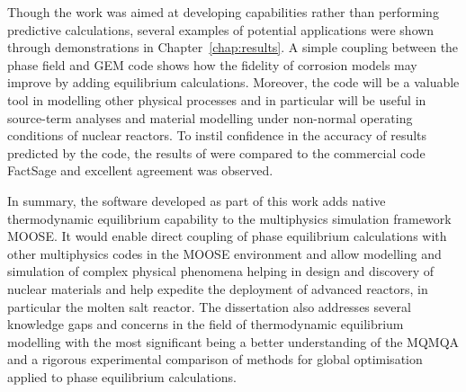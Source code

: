 	Though the work was aimed at developing capabilities rather than performing predictive calculations, several examples of potential applications were shown through demonstrations in Chapter~\ref{chap:results}. A simple coupling between the phase field and GEM code shows how the fidelity of corrosion models may improve by adding equilibrium calculations. Moreover, the code will be a valuable tool in modelling other physical processes and in particular will be useful in source-term analyses and material modelling under non-normal operating conditions of nuclear reactors. To instil confidence in the accuracy of results predicted by the code, the results of {\GEM} were compared to the commercial code FactSage and excellent agreement was observed.
	
	In summary, the software developed as part of this work adds native thermodynamic equilibrium capability to the multiphysics simulation framework MOOSE. It would enable direct coupling of phase equilibrium calculations with other multiphysics codes in the MOOSE environment and allow modelling and simulation of complex physical phenomena helping in design and discovery of nuclear materials and help expedite the deployment of advanced reactors, in particular the molten salt reactor. The dissertation also addresses several knowledge gaps and concerns in the field of thermodynamic equilibrium modelling with the most significant being a better understanding of the MQMQA and a rigorous experimental comparison of methods for global optimisation applied to phase equilibrium calculations.
	
	
	